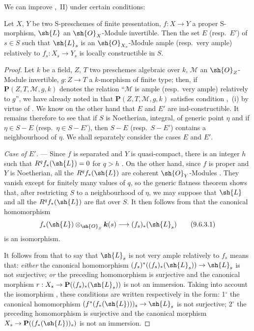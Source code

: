 We can improve ,~II) under certain conditions:

\begin{proposition}[9.6.3]
\label{IV.9.6.3}
Let $X$, $Y$ be two S-preschemes of finite presentation, $f:X\to Y$ a proper S-morphism, $\sh{L}$ an $\sh{O}_X$-Module invertible.
Then the set $E$ (resp.\ $E'$) of $s\in S$ such that $\sh{L}_s$ is an $\sh{O}_{X_s}$-Module ample (resp.\ very ample) relatively to $f_s:X_s\to Y_s$ is locally constructible in $S$.
\end{proposition}

\begin{proof}
Let $k$ be a field, $Z$, $T$ two preschemes algebraic over $k$, $\mathscr{M}$ an $\sh{O}_Z$-Module invertible, $g:Z\to T$ a $k$-morphism of finite type; then, if $\mathbf{P}(Z,T,\mathscr{M},g,k)$ denotes the relation ``$\mathscr{M}$ is ample (resp.\ very ample) relatively to $g$'', we have already noted in  that $\mathbf{P}(Z,T,\mathscr{M},g,k)$ satisfies condition ,~(i) by virtue of .
We know on the other hand that $E$ and $E'$ are ind-constructible.
It remains therefore to see that if $S$ is Noetherian, integral, of generic point $\eta$ and if $\eta\in S-E$ (resp.\ $\eta\in S-E'$), then $S-E$ (resp.\ $S-E'$) contains a neighbourhood of $\eta$.
We shall separately consider the cases $E$ and $E'$.


\emph{Case of $E'$.} ---
Since $f$ is separated and $Y$ is quasi-compact, there is an integer $h$ such that
$R^qf_*(\sh{L})=0$ for $q>h$ .
On the other hand, since $f$ is proper and $Y$ is Noetherian, all the
$R^qf_*(\sh{L})$ are coherent $\sh{O}_Y$-Modules .
They vanish except for finitely many values of $q$, so the generic flatness theorem
 shows that, after restricting $S$ to a neighbourhood of $\eta$, we may
suppose that $\sh{L}$ and all the $R^qf_*(\sh{L})$ are flat over $S$.
It then follows from  that the canonical homomorphism
\begin{equation}
\label{IV.9.6.3.1}
 f_*(\sh{L})\otimes_{\sh{O}_S}\boldsymbol{k}(s)
 \longrightarrow (f_s)_*(\sh{L}_s)
 \tag{9.6.3.1}
\end{equation}
is an isomorphism.

It follows from  that to say that $\sh{L}_s$ is not very ample relatively to $f_s$ means that: \emph{either} the canonical homomorphism $(f_s)^*((f_s)_*(\sh{L}_s))\to\sh{L}_s$ is not surjective; \emph{or} the preceding homomorphism is surjective and the canonical morphism $r:X_s\to\mathbf{P}((f_s)_*(\sh{L}_s))$ is not an immersion.
Taking into account the isomorphism , these conditions are written respectively in the form: 1$^\circ$ the canonical homomorphism $(f^*(f_*(\sh{L})))_s\to\sh{L}_s$ is not surjective; 2$^\circ$ the preceding homomorphism is surjective and the canonical morphism $X_s\to\mathbf{P}((f_*(\sh{L}))_s)$ is not an immersion.


\end{proof}
